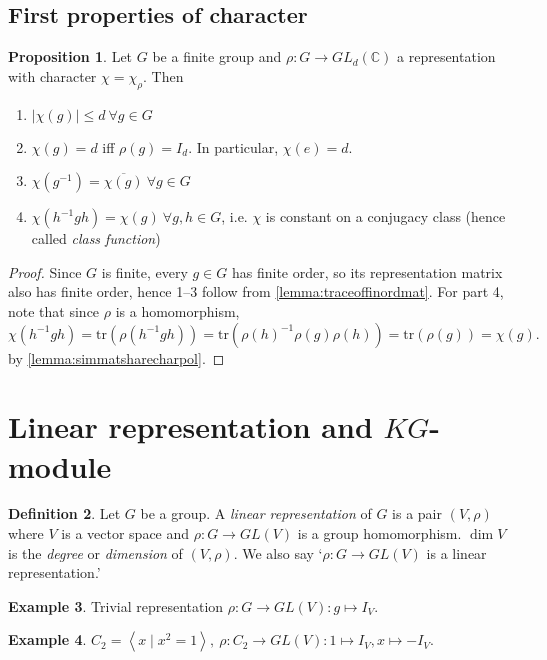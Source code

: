 \documentclass{article}
\newcommand{\tr}{\text{tr}}
\newcommand{\la}{\left\langle}
\newcommand{\ra}{\right\rangle}
\newcommand{\C}{\mathbb{C}}
\theoremstyle{definition}
\newtheorem{defn}{Definition}[subsection]
\newtheorem{prop}[defn]{Proposition}
\newtheorem{example}[defn]{Example}
\begin{document}
\subsection{First properties of character}
\begin{prop}
\label{prop:1stpropofchar}
Let $G$ be a finite group and $\rho:G\rightarrow GL_d(\C)$ a representation with character $\chi=\chi_\rho$. Then
\begin{enumerate}
\item $|\chi(g)|\leq d \ \forall g\in G$
\item $\chi(g)=d$ iff $\rho(g)=I_d$. In particular, $\chi(e)=d$.
\item $\chi\left(g^{-1}\right)=\overline{\chi(g)} \ \forall g\in G$
\item $\chi\left(h^{-1}gh\right)=\chi(g) \ \forall g,h\in G$, i.e. $\chi$ is constant on a conjugacy class (hence called \textit{class function})
\end{enumerate}
\end{prop}
\begin{proof}
Since $G$ is finite, every $g\in G$ has finite order, so its representation matrix also has finite order, hence 1–3 follow from \ref{lemma:traceoffinordmat}. For part 4, note that since $\rho$ is a homomorphism,
\[
\chi\left(h^{-1}gh\right)=\tr\left(\rho\left(h^{-1}gh\right)\right)=\tr\left(\rho(h)^{-1}\rho(g)\rho(h)\right)=\tr(\rho(g))=\chi(g).
\]
by \ref{lemma:simmatsharecharpol}.
\end{proof}

\section{Linear representation and $KG$-module}
\begin{defn}
Let $G$ be a group. A \textit{linear representation} of $G$ is a pair $(V,\rho)$ where $V$ is a vector space and $\rho:G\rightarrow GL(V)$ is a group homomorphism. $\dim V$ is the \textit{degree} or \textit{dimension} of $(V,\rho)$. We also say `$\rho:G\rightarrow GL(V)$ is a linear representation.'
\end{defn}

\begin{example}
Trivial representation $\rho:G\rightarrow GL(V):g\mapsto I_V$.
\end{example}

\begin{example}
$C_2=\la x \mid x^2=1\ra,\ \rho:C_2\rightarrow GL(V):1\mapsto I_V, x\mapsto -I_V$.
\end{example}
\end{document}
